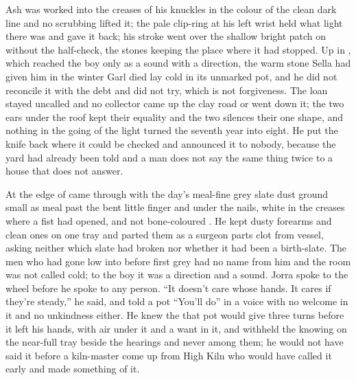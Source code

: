 Ash was worked into the creases of his knuckles in the colour of the clean dark line and no scrubbing lifted it; the pale clip-ring at his left wrist held what light there was and gave it back; his stroke went over the shallow bright patch on  without the half-check, the stones keeping the place where it had stopped. Up in , which reached the boy only as a sound with a direction, the warm stone Sella had given him in the winter Garl died lay cold in its unmarked pot, and he did not reconcile it with the debt and did not try, which is not forgiveness. The loan stayed uncalled and no collector came up the clay road or went down it; the two ears under the roof kept their equality and the two silences their one shape, and nothing in the going of the light turned the seventh year into eight. He put the knife back where it could be checked and announced it to nobody, because the yard had already been told and a man does not say the same thing twice to a house that does not answer.

\scenebreak

At the edge of   came through with the day's meal-fine grey slate dust ground small as meal past the bent little finger and under the nails, white in the creases where a fist had opened, and not bone-coloured . He kept dusty forearms and clean ones on one tray and parted them as a surgeon parts clot from vessel, asking neither which slate had broken nor whether it had been a birth-slate. The men who had gone low into  before first grey had no name from him and the room was not called cold; to the boy it was a direction and a sound. Jorra spoke to the wheel before he spoke to any person. “It doesn't care whose hands. It cares if they're steady,” he said, and told a pot “You'll do” in a voice with no welcome in it and no unkindness either. He knew the  that pot would give three turns before it left his hands, with air under it and a want in it, and withheld the knowing on the near-full tray beside the hearings and never among them; he would not have said it before a kiln-master come up from High Kiln who would have called it early and made something of it.

